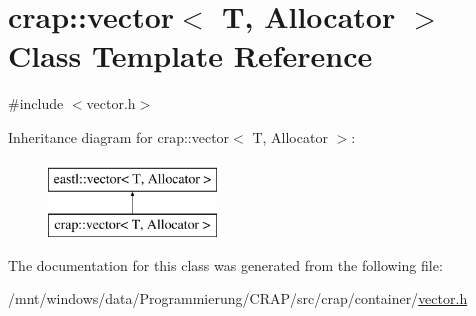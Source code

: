 \hypertarget{classcrap_1_1vector}{\section{crap\-:\-:vector$<$ T, Allocator $>$ Class Template Reference}
\label{classcrap_1_1vector}
}


{\ttfamily \#include $<$vector.\-h$>$}

Inheritance diagram for crap\-:\-:vector$<$ T, Allocator $>$\-:\begin{figure}[H]
\begin{center}
\leavevmode
\includegraphics[height=2.000000cm]{classcrap_1_1vector}
\end{center}
\end{figure}


The documentation for this class was generated from the following file\-:\begin{DoxyCompactItemize}
\item 
/mnt/windows/data/\-Programmierung/\-C\-R\-A\-P/src/crap/container/\hyperlink{vector_8h}{vector.\-h}\end{DoxyCompactItemize}
